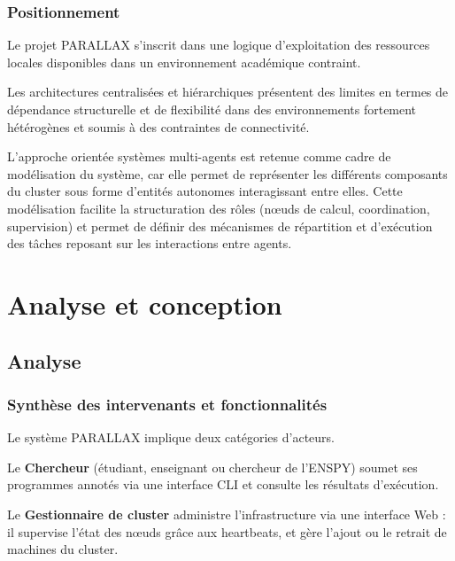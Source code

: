 \documentclass[12pt,a4paper]{report}
\begin{document}
\subsection{Positionnement}

Le projet PARALLAX s'inscrit dans une logique d'exploitation des ressources locales disponibles dans un environnement académique contraint.

Les architectures centralisées et hiérarchiques présentent des limites en termes de dépendance structurelle et de flexibilité dans des environnements fortement hétérogènes et soumis à des contraintes de connectivité.

L'approche orientée systèmes multi-agents est retenue comme cadre de modélisation du système, car elle permet de représenter les différents composants du cluster sous forme d'entités autonomes interagissant entre elles. Cette modélisation facilite la structuration des rôles (nœuds de calcul, coordination, supervision) et permet de définir des mécanismes de répartition et d'exécution des tâches reposant sur les interactions entre agents.
\chapter{Analyse et conception}
\section{Analyse}

\subsection{Synthèse des intervenants et fonctionnalités}

Le système PARALLAX implique deux catégories d'acteurs.

Le \textbf{Chercheur} (étudiant, enseignant ou chercheur de l'ENSPY) soumet ses programmes annotés via une interface CLI et consulte les résultats d'exécution.

Le \textbf{Gestionnaire de cluster} administre l'infrastructure via une interface Web : il supervise l'état des nœuds grâce aux heartbeats, et gère l'ajout ou le retrait de machines du cluster.
\end{document}
